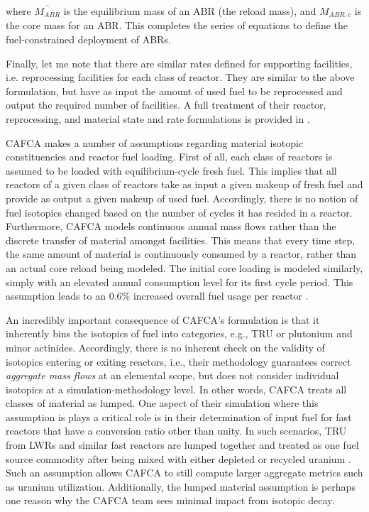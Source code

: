 where $\bar{M_{ABR}}$ is the equilibrium mass of an ABR (the reload mass), and
$M_{ABR,c}$ is the core mass for an ABR. This completes the series of equations
to define the fuel-constrained deployment of ABRs.

Finally, let me note that there are similar rates defined for supporting
facilities, i.e. reprocessing facilities for each class of reactor. They are
similar to the above formulation, but have as input the amount of used fuel to
be reprocessed and output the required number of facilities. A full treatment of
their reactor, reprocessing, and material state and rate formulations is
provided in \cite{busquim_e_silva_system_2008}.

CAFCA makes a number of assumptions regarding material isotopic constituencies
and reactor fuel loading. First of all, each class of reactors is assumed to be
loaded with equilibrium-cycle fresh fuel. This implies that all reactors of a
given class of reactors take as input a given makeup of fresh fuel and provide
as output a given makeup of used fuel. Accordingly, there is no notion of fuel
isotopics changed based on the number of cycles it has resided in a
reactor. Furthermore, CAFCA models continuous annual mass flows rather than the
discrete transfer of material amongst facilities. This means that every time
step, the same amount of material is continuously consumed by a reactor, rather
than an actual core reload being modeled. The initial core loading is modeled
similarly, simply with an elevated annual consumption level for its first cycle
period. This assumption leads to an 0.6\% increased overall fuel usage per
reactor \cite{guerin_impact_2009}.

An incredibly important consequence of CAFCA's formulation is that it inherently
bins the isotopics of fuel into categories, e.g., TRU or plutonium and minor
actinides. Accordingly, there is no inherent check on the validity of isotopics
entering or exiting reactors, i.e., their methodology guarantees
correct \textit{aggregate mass flows} at an elemental scope, but does not
consider individual isotopics at a simulation-methodology level. In other words,
CAFCA treats all classes of material as lumped\cite{guerin_impact_2009}. One
aspect of their simulation where this assumption is plays a critical role is in
their determination of input fuel for fast reactors that have a conversion ratio
other than unity. In such scenarios, TRU from LWRs and similar fast reactors are
lumped together and treated as one fuel source commodity after being mixed with
either depleted or recycled uranium \cite{guerin_impact_2009}. Such an
assumption allows CAFCA to still compute larger aggregate metrics such as
uranium utilization. Additionally, the lumped material assumption is perhaps one
reason why the CAFCA team sees minimal impact from isotopic decay.

